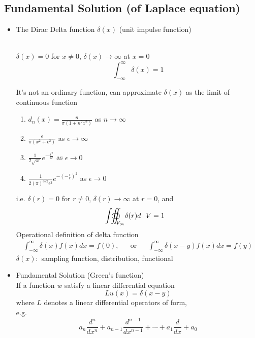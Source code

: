 \subsection{Fundamental Solution (of Laplace equation)}
\begin{itemize}
\item The Dirac Delta function $\delta(x)$ (unit impulse function)
\begin{definition}\mbox{}\\
$\delta(x) = 0$ for $x\neq 0$, $\delta(x)\to \infty$ at $x = 0$
\begin{equation}
\int_{-\infty}^\infty\delta(x) = 1
\label{eq: 4-2-1}
\end{equation}
\end{definition}
It's not an ordinary function, can approximate $\delta(x) $ as the limit of continuous function
\begin{enumerate}[label = \protect\circled{\arabic*}]
\item $\displaystyle d_n(x) = \frac{n}{\pi\left(1+n^2x^2\right)}$ as $n\to\infty$
\item $\displaystyle\frac{\epsilon}{\pi\left(x^2+\epsilon^2\right)}$ as $\epsilon\to\infty$
\item $\displaystyle\frac{1}{2\sqrt{\pi\epsilon}}e^{-\displaystyle\frac{x^2}{4\epsilon}}$ as $\epsilon\to 0$
\item $\displaystyle\frac{1}{2\left(\pi\right)^{3/2}\epsilon^3}e^{-\displaystyle\left(-\frac{r}{\epsilon}\right)^2}$ as $\epsilon\to 0$
\end{enumerate}
i.e. $\delta(r) = 0$ for $r\neq 0$, $\delta(r)\to\infty$ at $r=0$, and 
\[
{\oiint \hspace{-23.5pt} \int}_{\volume_\infty}\delta(r)d\volume = 1
\]
Operational definition of delta function
\begin{align*}
\int_{-\infty}^\infty\delta(x)f(x)dx = f(0), &&\text{or}&&\int_{-\infty}^\infty\delta(x-y)f(x)dx = f(y)
\end{align*}
$\delta(x)\colon$ sampling function, distribution, functional
\item Fundamental Solution (Green's function)\\
If a function $w$ satisfy a linear differential equation
\begin{equation}
Lu(x) = \delta(x-y)
\label{eq: 4-2-2}
\end{equation}
where $L$ denotes a linear differential operators of form,\\
e.g.
\[
a_n\frac{d^n}{dx^n} + a_{n-1}\frac{d^{n-1}}{dx^{n-1}} + \cdots + a_1\frac{d}{dx} + a_0
\]
\end{itemize}
